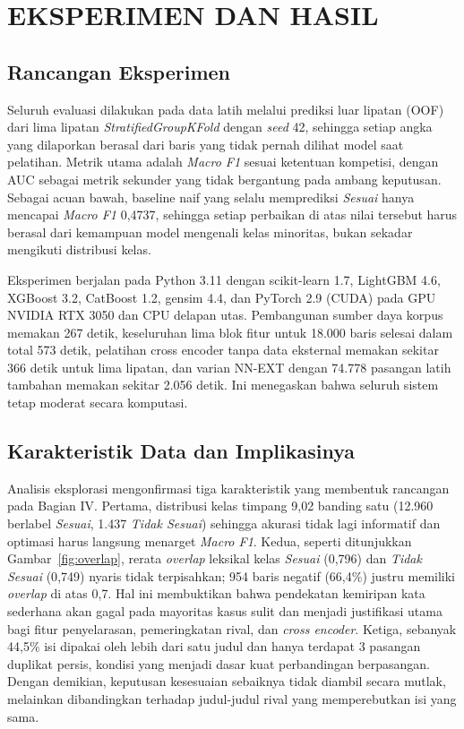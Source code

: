 \section{EKSPERIMEN DAN HASIL}

\subsection{Rancangan Eksperimen}
Seluruh evaluasi dilakukan pada data latih melalui prediksi luar lipatan (OOF) dari lima lipatan \textit{StratifiedGroupKFold} dengan \textit{seed} 42, sehingga setiap angka yang dilaporkan berasal dari baris yang tidak pernah dilihat model saat pelatihan. Metrik utama adalah \textit{Macro F1} sesuai ketentuan kompetisi, dengan AUC sebagai metrik sekunder yang tidak bergantung pada ambang keputusan. Sebagai acuan bawah, baseline naif yang selalu memprediksi \textit{Sesuai} hanya mencapai \textit{Macro F1} 0{,}4737, sehingga setiap perbaikan di atas nilai tersebut harus berasal dari kemampuan model mengenali kelas minoritas, bukan sekadar mengikuti distribusi kelas.

Eksperimen berjalan pada Python 3.11 dengan scikit-learn 1.7, LightGBM 4.6, XGBoost 3.2, CatBoost 1.2, gensim 4.4, dan PyTorch 2.9 (CUDA) pada GPU NVIDIA RTX 3050 dan CPU delapan utas. Pembangunan sumber daya korpus memakan 267 detik, keseluruhan lima blok fitur untuk 18.000 baris selesai dalam total 573 detik, pelatihan cross encoder tanpa data eksternal memakan sekitar 366 detik untuk lima lipatan, dan varian NN-EXT dengan 74.778 pasangan latih tambahan memakan sekitar 2.056 detik. Ini menegaskan bahwa seluruh sistem tetap moderat secara komputasi.

\subsection{Karakteristik Data dan Implikasinya}
Analisis eksplorasi mengonfirmasi tiga karakteristik yang membentuk rancangan pada Bagian IV. Pertama, distribusi kelas timpang 9{,}02 banding satu (12.960 berlabel \textit{Sesuai}, 1.437 \textit{Tidak Sesuai}) sehingga akurasi tidak lagi informatif dan optimasi harus langsung menarget \textit{Macro F1}. Kedua, seperti ditunjukkan Gambar~\ref{fig:overlap}, rerata \textit{overlap} leksikal kelas \textit{Sesuai} (0{,}796) dan \textit{Tidak Sesuai} (0{,}749) nyaris tidak terpisahkan; 954 baris negatif (66{,}4\%) justru memiliki \textit{overlap} di atas 0{,}7. Hal ini membuktikan bahwa pendekatan kemiripan kata sederhana akan gagal pada mayoritas kasus sulit dan menjadi justifikasi utama bagi fitur penyelarasan, pemeringkatan rival, dan \textit{cross encoder}. Ketiga, sebanyak 44{,}5\% isi dipakai oleh lebih dari satu judul dan hanya terdapat 3 pasangan duplikat persis, kondisi yang menjadi dasar kuat perbandingan berpasangan. Dengan demikian, keputusan kesesuaian sebaiknya tidak diambil secara mutlak, melainkan dibandingkan terhadap judul-judul rival yang memperebutkan isi yang sama.

